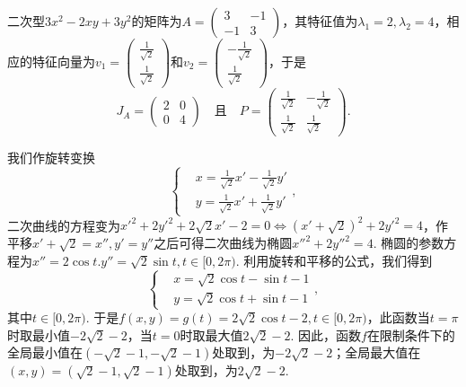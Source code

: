 \begin{solution}
  \begin{inparaenum}[(a)]
    \item 二次型$3x^2-2xy+3y^2$的矩阵为$A=\begin{pmatrix}
          3 & -1 \\
          -1 & 3
        \end{pmatrix}$，其特征值为$\lambda_1=2,\lambda_2=4$，相应的特征向量为$v_1=\begin{pmatrix}
          \frac1{\sqrt2} \\
          \frac1{\sqrt2}
        \end{pmatrix}$和$v_2=\begin{pmatrix}
          -\frac1{\sqrt2} \\
          \frac1{\sqrt2}
        \end{pmatrix}$，于是
        \[
          J_A = \begin{pmatrix}
            2 & 0 \\
            0 & 4
          \end{pmatrix} \quad \text{且} \quad
          P = \begin{pmatrix}
            \frac1{\sqrt2} & - \frac1{\sqrt2} \\
            \frac1{\sqrt2} & \frac1{\sqrt2}
          \end{pmatrix}.
        \]

       我们作旋转变换
       \[
         \left\{
           \begin{aligned}
             & x = \frac1{\sqrt2}x' - \frac1{\sqrt2}y' \\
             & y = \frac1{\sqrt2}x' + \frac1{\sqrt2}y'
           \end{aligned}
         \right.,
       \]
    二次曲线的方程变为$x'^2+2y'^2+2\sqrt2x'-2=0\Leftrightarrow (x'+\sqrt2)^2+2y'^2=4$，作平移$x'+\sqrt2=x'',y'=y''$之后可得二次曲线为椭圆$x''^2+2y''^2=4$. 椭圆的参数方程为$x''=2\cos t.y''=\sqrt2\sin t,t\in[0,2\pi)$. 利用旋转和平移的公式，我们得到
    \[
      \left\{
        \begin{aligned}
          & x = \sqrt2\cos t - \sin t - 1 \\
          & y = \sqrt2\cos t + \sin t - 1
        \end{aligned}
      \right.,
    \]
    其中$t\in[0,2\pi)$. 于是$f(x,y)=g(t)=2\sqrt2\cos t-2,t\in[0,2\pi)$，此函数当$t=\pi$时取最小值$-2\sqrt2-2$，当$t=0$时取最大值$2\sqrt2-2$. 因此，函数$f$在限制条件下的全局最小值在$(-\sqrt2-1,-\sqrt2-1)$处取到，为$-2\sqrt2-2$；全局最大值在$(x,y)=(\sqrt2-1,\sqrt2-1)$处取到，为$2\sqrt2-2$.


\end{inparaenum}
\end{solution}
